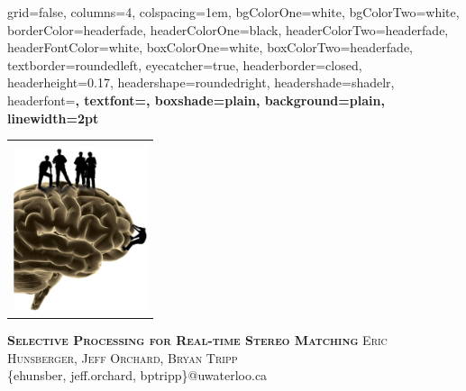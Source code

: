 \documentclass[landscape,final,a0paper,fontscale=0.285]{baposter}
\begin{document}



\begin{poster}%
  {
  grid=false,
  columns=4,
  colspacing=1em,
  bgColorOne=white,
  bgColorTwo=white,
  borderColor=headerfade,
  headerColorOne=black,
  headerColorTwo=headerfade,
  headerFontColor=white,
  boxColorOne=white,
  boxColorTwo=headerfade,
  textborder=roundedleft,
  eyecatcher=true,
  headerborder=closed,
  headerheight=0.17\textheight,
  headershape=roundedright,
  headershade=shadelr,
  headerfont=\Large\bf\textsc, %
  textfont={\setlength{\parindent}{1.5em}},
  boxshade=plain,
  background=plain,
  linewidth=2pt
  }
  {
    \begin{tabular}{c}
      \relax\\
      \includegraphics[height=13em]{brain.png}
    \end{tabular}
  }
  {
    \textbf{\textsc{Selective Processing for Real-time Stereo Matching}}\vspace{0.5em}
  }
  {
    \textsc{Eric Hunsberger, Jeff Orchard, Bryan Tripp}\\[0.2em]
    \{ehunsber, jeff.orchard, bptripp\}@uwaterloo.ca\\[0.4em]
}
\end{poster}
\end{document}
